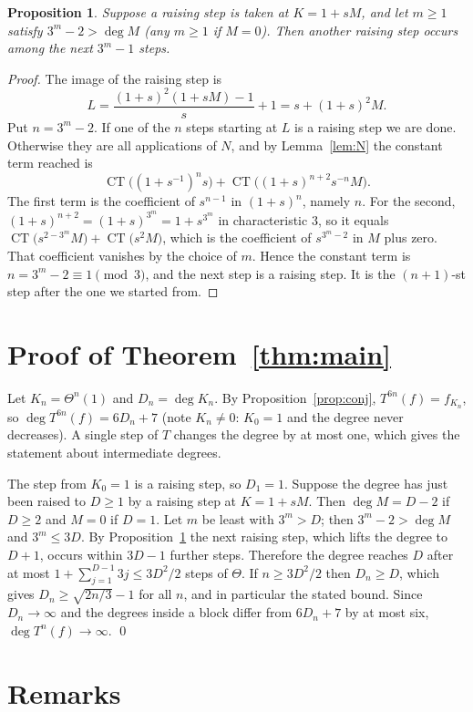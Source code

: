 \documentclass[11pt,a4paper]{article}
\newtheorem{proposition}{Proposition}
\theoremstyle{remark}
\newcommand{\CT}{\operatorname{CT}}
\begin{document}
\begin{proposition}\label{prop:recur}
Suppose a raising step is taken at $K=1+sM$, and let $m\ge1$ satisfy $3^m-2>\deg M$ (any $m\ge1$
if $M=0$). Then another raising step occurs among the next $3^m-1$ steps.
\end{proposition}
\begin{proof}
The image of the raising step is
\[
 L=\frac{(1+s)^2(1+sM)-1}{s}+1=s+(1+s)^2M .
\]
Put $n=3^m-2$. If one of the $n$ steps starting at $L$ is a raising step we are done. Otherwise
they are all applications of $N$, and by Lemma~\ref{lem:N} the constant term reached is
\[
 \CT\bigl((1+s^{-1})^n s\bigr)+\CT\bigl((1+s)^{n+2}s^{-n}M\bigr).
\]
The first term is the coefficient of $s^{n-1}$ in $(1+s)^n$, namely $n$. For the second,
$(1+s)^{n+2}=(1+s)^{3^m}=1+s^{3^m}$ in characteristic $3$, so it equals
$\CT\bigl(s^{2-3^m}M\bigr)+\CT\bigl(s^{2}M\bigr)$, which is the coefficient of $s^{3^m-2}$ in $M$
plus zero. That coefficient vanishes by the choice of $m$. Hence the constant term is
$n=3^m-2\equiv1\pmod 3$, and the next step is a raising step. It is the $(n+1)$-st step after the
one we started from.
\end{proof}

\section{Proof of Theorem~\ref{thm:main}}

Let $K_n=\Theta^n(1)$ and $D_n=\deg K_n$. By Proposition~\ref{prop:conj},
$T^{6n}(f)=f_{K_n}$, so $\deg T^{6n}(f)=6D_n+7$ (note $K_n\ne0$: $K_0=1$ and the degree never
decreases). A single step of $T$ changes the degree by at most one, which gives the statement
about intermediate degrees.

The step from $K_0=1$ is a raising step, so $D_1=1$. Suppose the degree has just been raised to
$D\ge1$ by a raising step at $K=1+sM$. Then $\deg M=D-2$ if $D\ge2$ and $M=0$ if $D=1$. Let $m$ be
least with $3^m>D$; then $3^m-2>\deg M$ and $3^m\le3D$. By Proposition~\ref{prop:recur} the next
raising step, which lifts the degree to $D+1$, occurs within $3D-1$ further steps. Therefore the
degree reaches $D$ after at most $1+\sum_{j=1}^{D-1}3j\le 3D^2/2$ steps of $\Theta$. If
$n\ge 3D^2/2$ then $D_n\ge D$, which gives $D_n\ge\sqrt{2n/3}-1$ for all $n$, and in particular
the stated bound. Since $D_n\to\infty$ and the degrees inside a block differ from $6D_n+7$ by at
most six, $\deg T^n(f)\to\infty$. \qed

\section{Remarks}
\end{document}
